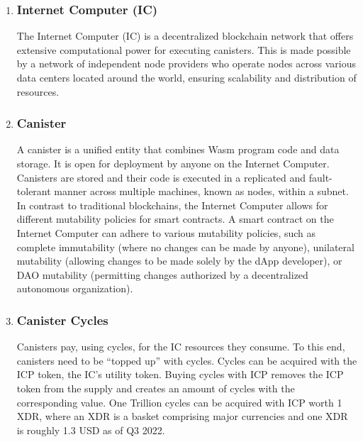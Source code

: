 \begin{enumerate}
    \item \subsubsection{Internet Computer (IC)}
    The Internet Computer (IC) is a decentralized blockchain network that offers extensive computational power for executing canisters. This is made possible by a network of independent node providers who operate nodes across various data centers located around the world, ensuring scalability and distribution of resources.

    \item \subsubsection{Canister}  A canister is a unified entity that combines \ac{Wasm} \cite{webassemblywiki} program code and data storage. It is open for deployment by anyone on the Internet Computer. Canisters are stored and their code is executed in a replicated and fault-tolerant manner across multiple machines, known as nodes, within a subnet. In contrast to traditional blockchains, the Internet Computer allows for different mutability policies for smart contracts. A smart contract on the Internet Computer can adhere to various mutability policies, such as complete immutability (where no changes can be made by anyone), unilateral mutability (allowing changes to be made solely by the dApp developer), or \ac{DAO} mutability (permitting changes authorized by a decentralized autonomous organization).

    \item \subsubsection{Canister Cycles}
    Canisters pay, using cycles, for the \ac{IC} resources they consume. To this end, canisters need to be “topped up” with cycles. Cycles can be acquired with the ICP token, the \ac{IC}'s utility token. Buying cycles with ICP removes the ICP token from the supply and creates an amount of cycles with the corresponding value. One Trillion cycles can be acquired with ICP worth 1 XDR, where an XDR is a basket comprising major currencies and one XDR is roughly 1.3 USD as of Q3 2022.


\end{enumerate}
